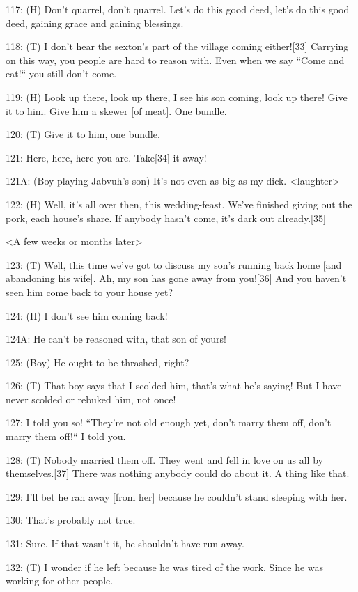 {117: (H) Don't quarrel, don't quarrel. Let's do this good deed, let's do
this good deed, gaining grace and gaining blessings.}

{118: (T) I don't hear the sexton's part of the village coming either![33]
Carrying on this way, you people are hard to reason with. Even when we say ``Come
and eat!`` you still don't come. }

{119: (H) Look up there, look up there, I see his son coming, look up there!
Give it to him. Give him a skewer [of meat]. One bundle. }

{120: (T) Give it to him, one bundle.}

{121: Here, here, here you are. Take[34] it away! }

{121A: (Boy playing Jabvuh's son) It's not even as big as my dick. <laughter>}

{122: (H) Well, it's all over then, this wedding-feast. We've finished giving
out the pork, each house's share. If anybody hasn't come, it's dark out already.[35]}

\begin{center}
{<A few weeks or months later>}
\end{center}

\leftskip=0pt
{123: (T) Well, this time we've got to discuss my son's running back home
[and abandoning his wife]. Ah, my son has gone away from you![36] And you haven't
seen him come back to your house yet?}

{124: (H) I don't see him coming back!}

{124A: He can't be reasoned with, that son of yours!}

{125: (Boy) He ought to be thrashed, right?}

{126: (T) That boy says that I scolded him, that's what he's saying! But
I have never scolded or rebuked him, not once!}

{127: I told you so! ``They're not old enough yet, don't marry them
off, don't marry them off!`` I told you.}

{128: (T) Nobody married them off. They went and fell in love on us all
by themselves.[37] There was nothing anybody could do about it. A thing like that.}

{129: I'll bet he ran away [from her] because he couldn't stand sleeping
with her.}

{130: That's probably not true.}

{131: Sure. If that wasn't it, he shouldn't have run away.}

{132: (T) I wonder if he left because he was tired of the work. Since he
was working for other people.}

